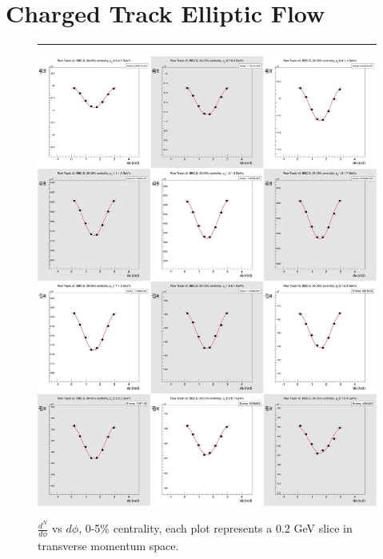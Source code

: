 \section{Charged Track Elliptic Flow}
\begin{figure}[H]
  \centering
  \caption[$\frac{dN}{d\phi}$ vs $d\phi$, 0-5\% centrality.]{$\frac{d^N}{d\phi}$ vs $d\phi$, 0-5\% centrality, each plot represents a 0.2 GeV slice in transverse momentum space.}
  \rule{35em}{0.5pt}
    \includegraphics[width=1\textwidth]{chargedtrackv2/htrkdphi2bbcs_0.jpg}
  \label{fig:Ndphicent0}
\end{figure}

